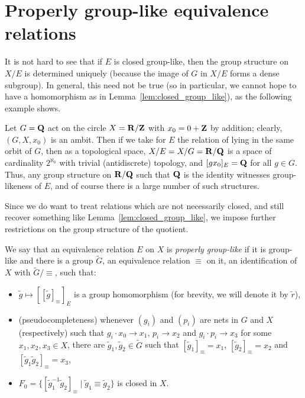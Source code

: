 	
	\section{Properly group-like equivalence relations}
	It is not hard to see that if $E$ is closed group-like, then the group structure on $X/E$ is determined uniquely (because the image of $G$ in $X/E$ forms a dense subgroup). In general, this need not be true (so in particular, we cannot hope to have a homomorphism as in Lemma~\ref{lem:closed_group_like}), as the following example shows.
	
	\begin{ex}
		\label{ex:nonunique_structure}
		Let $G={{\mathbf{Q}}}$ act on the circle $X={\mathbf{R}}/{\mathbf{Z}}$ with $x_0=0+{\mathbf{Z}}$ by addition; clearly,  $(G,X,x_0)$ is an ambit. Then if we take for $E$ the relation of lying in the same orbit of $G$, then as a topological space, $X/E=X/G={\mathbf{R}}/{\mathbf{Q}}$ is a space of cardinality $2^{\aleph_0}$ with trivial (antidiscrete) topology, and $[gx_0]_E={\mathbf{Q}}$ for all $g\in G$. Thus, any group structure on ${\mathbf{R}}/{\mathbf{Q}}$ such that ${\mathbf{Q}}$ is the identity witnesses group-likeness of $E$, and of course there is a large number of such structures.\xqed{\lozenge}
	\end{ex}
	
	Since we do want to treat relations which are not necessarily closed, and still recover something like Lemma~\ref{lem:closed_group_like}, we impose further restrictions on the group structure of the quotient.
	
	\begin{dfn}
		\label{dfn:prop_glike}
		We say that an equivalence relation $E$ on $X$ is \emph{properly group-like} if it is group-like and there is a group $\tilde G$, an equivalence relation $\equiv$ on it, an identification of $X$ with $\tilde G/{\equiv}$, such that:
		\begin{figure}[H]
		\end{figure}
		\begin{itemize}
			\item
			$\tilde g\mapsto [[\tilde g]_\equiv]_E$ is a group homomorphism (for brevity, we will denote it by $\tilde r$),
			\item
			(pseudocompleteness) whenever $(g_i)$ and $(p_i)$ are nets in $G$ and $X$ (respectively) such that $g_i\cdot x_0\to x_1$, $p_i\to x_2$ and $g_i\cdot p_i\to x_3$ for some $x_1,x_2,x_3\in X$, there are $\tilde g_1,\tilde g_2\in \tilde G$ such that $[\tilde g_1]_\equiv=x_1$, $[\tilde g_2]_\equiv=x_2$ and $[\tilde g_1\tilde g_2]_\equiv=x_3$,
			\item $F_0=\{[\tilde g_1^{-1}\tilde g_2]_{\equiv}\mid \tilde g_1\equiv \tilde g_2\}$ is closed in $X$.\xqed{\lozenge}
		\end{itemize}
	\end{dfn}
	
